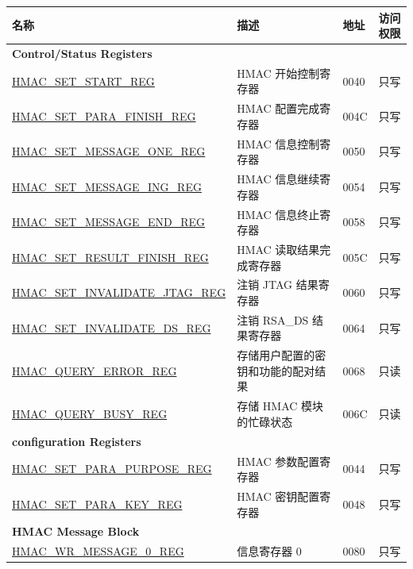 \begin{longtable}{ | p{6cm} | p{7.2cm} | p{1.3cm} | p{1cm} | }
\hline\rowcolor{lightgray}
名称 & 描述 &  地址 & 访问权限 \\ \hline
\endhead
\multicolumn{4}{|l|}{\textbf{Control/Status Registers}} \\ \hline
\hyperref[regdesc:HMACSETSTARTREG]{HMAC\_SET\_START\_REG} & HMAC 开始控制寄存器 & \hexprefix{}0040 & 只写 \\ \hline
\hyperref[regdesc:HMACSETPARAFINISHREG]{HMAC\_SET\_PARA\_FINISH\_REG} & HMAC 配置完成寄存器 & \hexprefix{}004C & 只写 \\ \hline
\hyperref[regdesc:HMACSETMESSAGEONEREG]{HMAC\_SET\_MESSAGE\_ONE\_REG} & HMAC 信息控制寄存器 & \hexprefix{}0050 & 只写 \\ \hline
\hyperref[regdesc:HMACSETMESSAGEINGREG]{HMAC\_SET\_MESSAGE\_ING\_REG} & HMAC 信息继续寄存器 & \hexprefix{}0054 & 只写 \\ \hline
\hyperref[regdesc:HMACSETMESSAGEENDREG]{HMAC\_SET\_MESSAGE\_END\_REG} & HMAC 信息终止寄存器 & \hexprefix{}0058 & 只写 \\ \hline
\hyperref[regdesc:HMACSETRESULTFINISHREG]{HMAC\_SET\_RESULT\_FINISH\_REG} & HMAC 读取结果完成寄存器 & \hexprefix{}005C & 只写 \\ \hline
\hyperref[regdesc:HMACSETINVALIDATEJTAGREG]{HMAC\_SET\_INVALIDATE\_JTAG\_REG} & 注销 JTAG 结果寄存器 & \hexprefix{}0060 & 只写 \\ \hline
\hyperref[regdesc:HMACSETINVALIDATEDSREG]{HMAC\_SET\_INVALIDATE\_DS\_REG} & 注销 RSA\_DS 结果寄存器 & \hexprefix{}0064 & 只写 \\ \hline
\hyperref[regdesc:HMACQUERYERRORREG]{HMAC\_QUERY\_ERROR\_REG} & 存储用户配置的密钥和功能的配对结果 & \hexprefix{}0068 & 只读 \\ \hline
\hyperref[regdesc:HMACQUERYBUSYREG]{HMAC\_QUERY\_BUSY\_REG} & 存储 HMAC 模块的忙碌状态 & \hexprefix{}006C & 只读 \\ \hline
\multicolumn{4}{|l|}{\textbf{configuration Registers}} \\ \hline
\hyperref[regdesc:HMACSETPARAPURPOSEREG]{HMAC\_SET\_PARA\_PURPOSE\_REG} & HMAC 参数配置寄存器 & \hexprefix{}0044 & 只写 \\ \hline
\hyperref[regdesc:HMACSETPARAKEYREG]{HMAC\_SET\_PARA\_KEY\_REG} & HMAC 密钥配置寄存器 & \hexprefix{}0048 & 只写 \\ \hline
\multicolumn{4}{|l|}{\textbf{HMAC Message Block}} \\ \hline
\hyperref[regdesc:HMACWRMESSAGENREG]{HMAC\_WR\_MESSAGE\_0\_REG} & 信息寄存器 0 & \hexprefix{}0080 & 只写 \\ \hline

\end{longtable}
